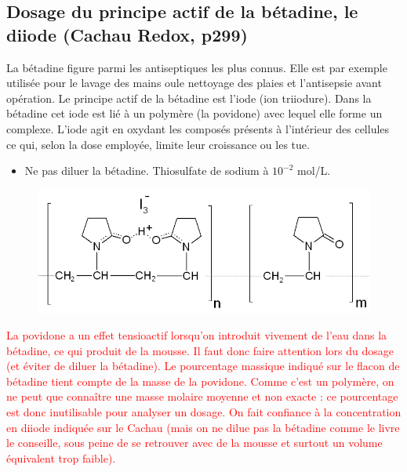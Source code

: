 \documentclass[11pt,a4paper]{report}
\begin{document}
\subsection{Dosage du principe actif de la bétadine, le diiode (Cachau Redox, p299)}

La bétadine figure parmi les antiseptiques les plus connus. Elle est par exemple utilisée pour le lavage des mains oule nettoyage des plaies et l'antisepsie avant opération. Le principe actif de la bétadine est l'iode (ion triiodure). Dans la bétadine cet iode est lié à un polymère (la povidone) avec lequel elle forme un complexe. L'iode agit en oxydant les composés présents à l'intérieur des cellules ce qui, selon la dose employée, limite leur croissance ou les tue.

\begin{itemize}
	\item Ne pas diluer la bétadine. Thiosulfate de sodium à $10^{-2}$ mol/L.
\end{itemize}

\begin{figure}[h!]
\begin{center}
	\includegraphics[scale = 0.5]{betadine.png}
	\label{fig:betadine}
\end{center}
\end{figure}

\textcolor{red}{La povidone a un effet tensioactif lorsqu'on introduit vivement de l'eau dans la bétadine, ce qui produit de la mousse. Il faut donc faire attention lors du dosage (et éviter de diluer la bétadine). Le pourcentage massique indiqué sur le flacon de bétadine tient compte de la masse de la povidone. Comme c'est un polymère, on ne peut que connaître une masse molaire moyenne et non exacte : ce pourcentage est donc inutilisable pour analyser un dosage. On fait confiance à la concentration en diiode indiquée sur le Cachau (mais on ne dilue pas la bétadine comme le livre le conseille, sous peine de se retrouver avec de la mousse et surtout un volume équivalent trop faible).}\\
\end{document}
